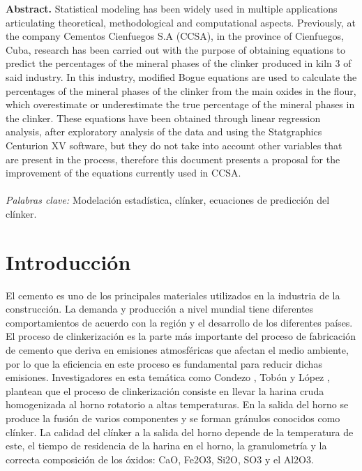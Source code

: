 \documentclass[spanish]{report}
\begin{document}
\textbf{Abstract.} Statistical modeling has been widely used in multiple applications articulating theoretical, methodological and computational aspects. Previously, at the company Cementos Cienfuegos S.A (CCSA), in the province of Cienfuegos, Cuba, research has been carried out with the purpose of obtaining equations to predict the percentages of the mineral phases of the clinker produced in kiln 3 of said industry. In this industry, modified Bogue equations are used to calculate the percentages of the mineral phases of the clinker from the main oxides in the flour, which overestimate or underestimate the true percentage of the mineral phases in the clinker. These equations have been obtained through linear regression analysis, after exploratory analysis of the data and using the Statgraphics Centurion XV software, but they do not take into account other variables that are present in the process, therefore this document presents a proposal for the improvement of the equations currently used in CCSA.\\
\vspace{.5cm}
\\
\emph{Palabras clave: } Modelación estadística, clínker, ecuaciones de predicción del clínker.

\section{Introducci\'on}
 El cemento es uno de los principales materiales utilizados en la industria de la construcción. La demanda y producción a nivel mundial tiene diferentes comportamientos de acuerdo con la región y el desarrollo de los diferentes países. El proceso de clinkerización es la parte más importante del proceso de fabricación de cemento que deriva en emisiones atmosféricas que afectan el medio ambiente, por lo que la eficiencia en este proceso es fundamental para reducir dichas emisiones. Investigadores en esta temática como Condezo \cite{condezo2020modelamiento}, Tobón y López \cite{tobon2007replanteamiento}, plantean que el proceso de clinkerización consiste en llevar la harina cruda homogenizada al horno rotatorio a altas temperaturas. En la salida del horno se produce la fusión de varios componentes y se forman gránulos conocidos como clínker. La calidad del clínker a la salida del horno depende de la temperatura de este, el tiempo de residencia de la harina en el horno, la granulometría y la correcta composición de los óxidos:  CaO, Fe2O3, Si2O, SO3 y el Al2O3. 
\end{document}
